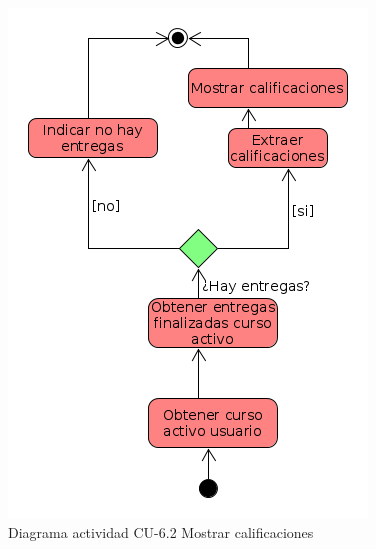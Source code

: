         \begin{figure}[!ht] %
\centering
\includegraphics[scale=0.4]{imagenes/diagramas/actividad/mostrar_calificaciones.png}  %

\caption{Diagrama actividad CU-6.2 Mostrar calificaciones}\label{figura152}
\end{figure}



    